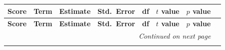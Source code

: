\documentclass{wiley-article}
\begin{document}
{\scriptsize                %
\setlength{\tabcolsep}{4pt} %

\begin{longtable}{@{}l p{} rrrrrr@{}}%
  \label{tab:lme_fixed} \\      %

  \toprule
  \textbf{Score} & \textbf{Term} & \textbf{Estimate} &
  \textbf{Std.\ Error} & \textbf{df} &
  \textbf{$t$ value} & \textbf{$p$ value} \\
  \midrule
  \endfirsthead

  \toprule
  \textbf{Score} & \textbf{Term} & \textbf{Estimate} &
  \textbf{Std.\ Error} & \textbf{df} &
  \textbf{$t$ value} & \textbf{$p$ value} \\
  \midrule
  \endhead

  \midrule \multicolumn{7}{r}{\scriptsize\itshape Continued on next page}\\
  \endfoot
  \bottomrule
  \endlastfoot


\end{longtable}}
\end{document}
